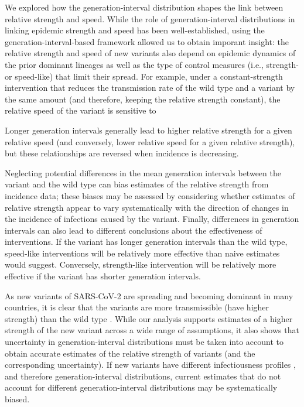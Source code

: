 \documentclass[12pt]{article}
\begin{document}
We explored how the generation-interval distribution shapes the link between relative strength and speed.
While the role of generation-interval distributions in linking epidemic strength and speed has been well-established, using the generation-interval-based framework allowed us to obtain imporant insight: the relative strength and speed of new variants also depend on epidemic dynamics of the prior dominant lineages as well as the type of control measures (i.e., strength- or speed-like) that limit their spread.
For example, under a constant-strength intervention that reduces the transmission rate of the wild type and a variant by the same amount (and therefore, keeping the relative strength constant), the relative speed of the variant is sensitive to 

Longer generation intervals generally lead to higher relative strength for a given relative speed (and conversely, lower relative speed for a given relative strength), but these relationships are reversed when incidence is decreasing.


Neglecting potential differences in the mean generation intervals between the variant and the wild type can bias estimates of the relative strength from incidence data;
these biases may be assessed by considering whether estimates of relative strength appear to vary systematically with the direction of changes in the incidence of infections caused by the variant.
Finally, differences in generation intervals can also lead to different conclusions about the effectiveness of interventions.
If the variant has longer generation intervals than the wild type, speed-like interventions will be relatively more effective than naive estimates would suggest. 
Conversely, strength-like intervention will be relatively more effective if the variant has shorter generation intervals.

As new variants of SARS-CoV-2 are spreading and becoming dominant in many countries, it is clear that the variants are more transmissible (have higher strength) than the wild type \citep{switzerland2021variant, davies2021estimated, di2021impact, graham2021changes, leung2021early, volz2021transmission,zhao2021}.
While our analysis supports estimates of a higher strength of the new variant across a wide range of assumptions, it also shows that uncertainty in generation-interval distributions must be taken into account to obtain accurate estimates of the relative strength of variants (and the corresponding uncertainty).
If new variants have different infectiousness profiles \citep{kissler2021densely,li2021viral,zhang2021transmission}, and therefore generation-interval distributions, current estimates that do not account for different generation-interval distributions may be systematically biased.
\end{document}
